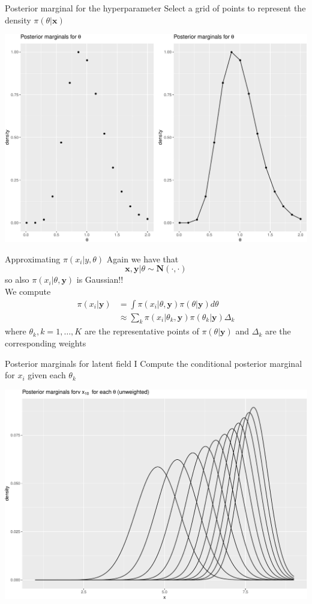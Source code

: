 \documentclass[
  ignorenonframetext,
]{beamer}
\begin{document}
\begin{frame}{Posterior marginal for the hyperparameter}
\protect\hypertarget{posterior-marginal-for-the-hyperparameter}{}
Select a grid of points to represent the density
\(\pi(\theta|\mathbf{x})\)

\begin{center}\includegraphics[width=0.6\linewidth]{Part2_deterministic_files/figure-beamer/unnamed-chunk-2-1} \end{center}
\end{frame}

\begin{frame}{Approximating \(\pi(x_i|y,\theta)\)}
\protect\hypertarget{approximating-pix_iytheta}{}
Again we have that \[
    \mathbf{x},\mathbf{y}|\theta\sim\mathbf{N}(\cdot,\cdot)
\] so also \(\pi(x_i|\theta,\mathbf{y})\) is Gaussian!!\\

We compute \begin{align*}
\pi(x_i|{\mathbf y}) &= \int \pi(x_i|\theta,{\mathbf y})\pi(\theta|{\mathbf y})d\theta\\
      &\approx \sum_k\pi(x_i|\theta_k,{\mathbf y})\pi(\theta_k|{\mathbf y}) \Delta_k
\end{align*} where \(\theta_k,k=1,\dots,K\) are the representative
points of \(\pi(\theta|\mathbf{y})\) and \(\Delta_k\) are the
corresponding weights
\end{frame}

\begin{frame}{Posterior marginals for latent field I}
\protect\hypertarget{posterior-marginals-for-latent-field-i}{}
Compute the conditional posterior marginal for \(x_i\) given each
\(\theta_k\)\\

\begin{center}\includegraphics[width=0.6\linewidth]{Part2_deterministic_files/figure-beamer/unnamed-chunk-3-1} \end{center}
\end{frame}
\end{document}
